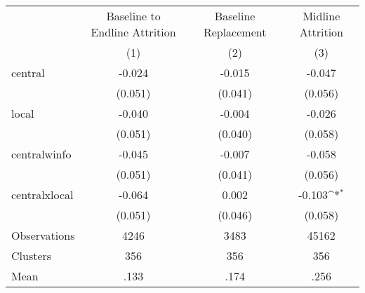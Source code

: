 {
\def\sym#1{\ifmmode^{#1}\else\(^{#1}\)\fi}
\begin{tabular}{l*{3}{c}}
\hline\hline
                &\multicolumn{1}{c}{Baseline to Endline Attrition}&\multicolumn{1}{c}{Baseline Replacement}&\multicolumn{1}{c}{Midline Attrition}\\
                &\multicolumn{1}{c}{(1)}         &\multicolumn{1}{c}{(2)}         &\multicolumn{1}{c}{(3)}         \\
\hline
central         &   -0.024         &   -0.015         &   -0.047         \\
                &  (0.051)         &  (0.041)         &  (0.056)         \\
local           &   -0.040         &   -0.004         &   -0.026         \\
                &  (0.051)         &  (0.040)         &  (0.058)         \\
centralwinfo    &   -0.045         &   -0.007         &   -0.058         \\
                &  (0.051)         &  (0.041)         &  (0.056)         \\
centralxlocal   &   -0.064         &    0.002         &   -0.103\sym{*}  \\
                &  (0.051)         &  (0.046)         &  (0.058)         \\
\hline
Observations    &     4246         &     3483         &    45162         \\
Clusters        &      356         &      356         &      356         \\
Mean            &     .133         &     .174         &     .256         \\
\hline\hline
\end{tabular}
}
